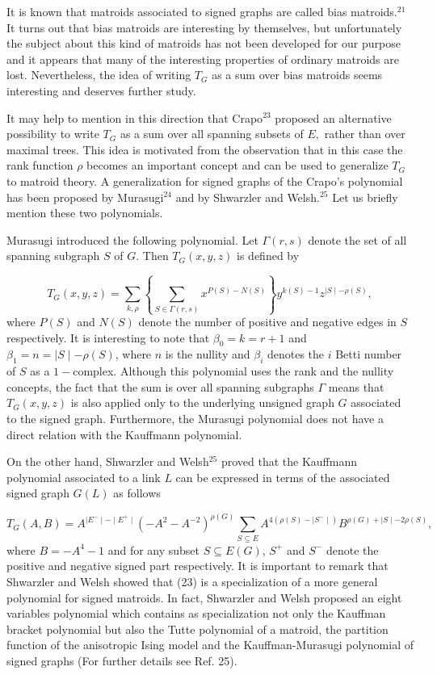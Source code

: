 \documentclass[a4paper,12pt]{article}
\begin{document}
It is known that matroids associated to signed graphs are called bias
matroids.$^{21}$ It turns out that bias matroids are interesting by
themselves, but unfortunately the subject about this kind of matroids has
not been developed for our purpose and it appears that many of the
interesting properties of ordinary matroids are lost. Nevertheless, the idea
of writing $T_{G}$ as a sum over bias matroids seems interesting and
deserves further study.

It may help to mention in this direction that Crapo$^{23}$ proposed an
alternative possibility to write $T_{G}$ as a sum over all spanning subsets
of $E,$ rather than over maximal trees. This idea is motivated from the
observation that in this case the rank function $\rho $ becomes an important
concept and can be used to generalize $T_{G}$ to matroid theory. A
generalization for signed graphs of the Crapo's polynomial has been proposed
by Murasugi$^{24}$ and by Shwarzler and Welsh.$^{25}$ Let us briefly mention
these two polynomials.

Murasugi introduced the following polynomial. Let $\Gamma (r,s)$ denote the
set of all spanning subgraph $S$ of $G.$ Then $T_{G}(x,y,z)$ is defined by

\begin{equation}
T_{G}(x,y,z)=\sum_{k,\rho }\left\{ \sum_{S\in \Gamma
(r,s)}x^{P(S)-N(S)}\right\} y^{k(S)-1}z^{\mid S\mid -\rho (S)},  \label{22}
\end{equation}
where $P(S)$ and $N(S)$ denote the number of positive and negative edges in $%
S$ respectively. It is interesting to note that $\beta _{0}=k=r+1$ and $%
\beta _{1}=n=\mid S\mid -\rho (S)$, where $n$ is the nullity and $\beta _{i}$
denotes the $i$ Betti number of $S$ as a $1-$complex$.$ Although this
polynomial uses the rank and the nullity concepts, the fact that the sum is
over all spanning subgraphs $\Gamma $ means that $T_{G}(x,y,z)$ is also
applied only to the underlying unsigned graph $G$ associated to the signed
graph. Furthermore, the Murasugi polynomial does not have a direct relation
with the Kauffmann polynomial.

On the other hand, Shwarzler and Welsh$^{25}$ proved that the Kauffmann
polynomial associated to a link $L$ can be expressed in terms of the
associated signed graph $G(L)$ as follows

\begin{equation}
T_{G}(A,B)=A^{\mid E^{-}\mid -\mid E^{+}\mid }(-A^{2}-A^{-2})^{\rho
(G)}\sum_{S\subseteq E}A^{4(\rho (S)-\mid S^{-}\mid )}B^{\rho (G)+\mid S\mid
-2\rho (S)},  \label{23}
\end{equation}
where $B=-A^{4}-1$ and for any subset $S\subseteq E(G)$, $S^{+}$ and $S^{-}$
denote the positive and negative signed part respectively. It is important
to remark that Shwarzler and Welsh showed that (23) is a specialization of a
more general polynomial for signed matroids. In fact, Shwarzler and Welsh
proposed an eight variables polynomial which contains as specialization not
only the Kauffman bracket polynomial but also the Tutte polynomial of a
matroid, the partition function of the anisotropic Ising model and the
Kauffman-Murasugi polynomial of signed graphs (For further details see Ref.
25). 
\bigskip
\end{document}

